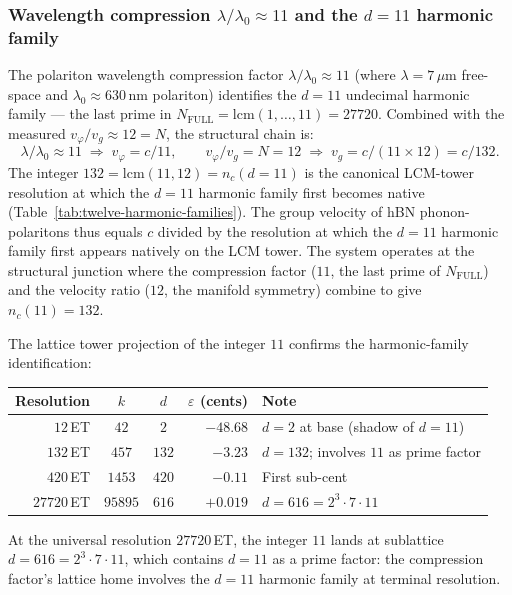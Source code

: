 \documentclass[11pt,a4paper]{article}
\theoremstyle{definition}
\theoremstyle{remark}
\begin{document}
\subsubsection*{Wavelength compression $\lambda/\lambda_{0} \approx 11$ and the $d=11$ harmonic family}

The polariton wavelength compression factor $\lambda/\lambda_{0} \approx 11$ (where $\lambda = 7\,\mu$m free-space and $\lambda_{0} \approx 630$\,nm polariton) identifies the $d=11$ undecimal harmonic family --- the last prime in $N_{\mathrm{FULL}} = \mathrm{lcm}(1,\ldots,11) = 27720$. Combined with the measured $v_{\varphi}/v_{g} \approx 12 = N$, the structural chain is:
\[
\lambda/\lambda_{0} \approx 11 \;\Rightarrow\; v_{\varphi} = c/11, \qquad v_{\varphi}/v_{g} = N = 12 \;\Rightarrow\; v_{g} = c/(11\times 12) = c/132.
\]
The integer $132 = \mathrm{lcm}(11,12) = n_{c}(d{=}11)$ is the canonical LCM-tower resolution at which the $d=11$ harmonic family first becomes native (Table~\ref{tab:twelve-harmonic-families}). The group velocity of hBN phonon-polaritons thus equals $c$ divided by the resolution at which the $d=11$ harmonic family first appears natively on the LCM tower. The system operates at the structural junction where the compression factor ($11$, the last prime of $N_{\mathrm{FULL}}$) and the velocity ratio ($12$, the manifold symmetry) combine to give $n_{c}(11) = 132$.

The lattice tower projection of the integer $11$ confirms the harmonic-family identification:
\begin{center}
\begin{tabular}{@{}r c c r l@{}}
\toprule
Resolution & $k$ & $d$ & $\varepsilon$ (cents) & Note\\
\midrule
$12$\,ET & $42$ & $2$ & $-48.68$ & $d=2$ at base (shadow of $d=11$)\\
$132$\,ET & $457$ & $132$ & $-3.23$ & $d=132$; involves $11$ as prime factor\\
$420$\,ET & $1453$ & $420$ & $-0.11$ & First sub-cent\\
$27720$\,ET & $95895$ & $616$ & $+0.019$ & $d = 616 = 2^{3}\!\cdot\!7\!\cdot\!11$\\
\bottomrule
\end{tabular}
\end{center}
At the universal resolution $27720$\,ET, the integer $11$ lands at sublattice $d = 616 = 2^{3}\cdot 7\cdot 11$, which contains $d=11$ as a prime factor: the compression factor's lattice home involves the $d=11$ harmonic family at terminal resolution.
\end{document}
